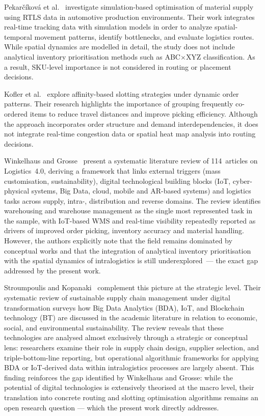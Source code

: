 \documentclass[12pt,a4paper]{article}
\begin{document}
Pekar\v{c}\'{i}kov\'{a} et al.~\cite{ref2} investigate simulation-based optimisation of
material supply using RTLS data in automotive production environments. Their work
integrates real-time tracking data with simulation models in order to analyze
spatial-temporal movement patterns, identify bottlenecks, and evaluate logistics routes.
While spatial dynamics are modelled in detail, the study does not include analytical inventory
prioritisation methods such as ABC$\times$XYZ classification. As a result, SKU-level
importance is not considered in routing or placement decisions.

Kofler et al.~\cite{ref3} explore affinity-based slotting strategies under dynamic order
patterns. Their research highlights the importance of grouping frequently co-ordered items
to reduce travel distances and improve picking efficiency. Although the approach incorporates
order structure and demand interdependencies, it does not integrate real-time congestion data
or spatial heat map analysis into routing decisions.

Winkelhaus and Grosse~\cite{ref4} present a systematic literature review of 114~articles
on Logistics~4.0, deriving a framework that links external triggers (mass customisation,
sustainability), digital technological building blocks (IoT, cyber-physical systems, Big
Data, cloud, mobile and AR-based systems) and logistics tasks across supply, intra-,
distribution and reverse domains. The review identifies warehousing and warehouse
management as the single most represented task in the sample, with IoT-based WMS and
real-time visibility repeatedly reported as drivers of improved order picking, inventory
accuracy and material handling. However, the authors explicitly note that the field
remains dominated by conceptual works and that the integration of analytical inventory
prioritisation with the spatial dynamics of intralogistics is still underexplored~--- the
exact gap addressed by the present work.

Stroumpoulis and Kopanaki~\cite{ref10} complement this picture at the strategic level.
Their systematic review of sustainable supply chain management under digital transformation
surveys how Big Data Analytics (BDA), IoT, and Blockchain technology (BT) are discussed
in the academic literature in relation to economic, social, and environmental sustainability.
The review reveals that these technologies are analysed almost exclusively through a
strategic or conceptual lens: researchers examine their role in supply chain design,
supplier selection, and triple-bottom-line reporting, but operational algorithmic frameworks
for applying BDA or IoT-derived data within intralogistics processes are largely absent.
This finding reinforces the gap identified by Winkelhaus and Grosse: while the potential
of digital technologies is extensively theorised at the macro level, their translation into
concrete routing and slotting optimisation algorithms remains an open research question
--- which the present work directly addresses.
\end{document}
